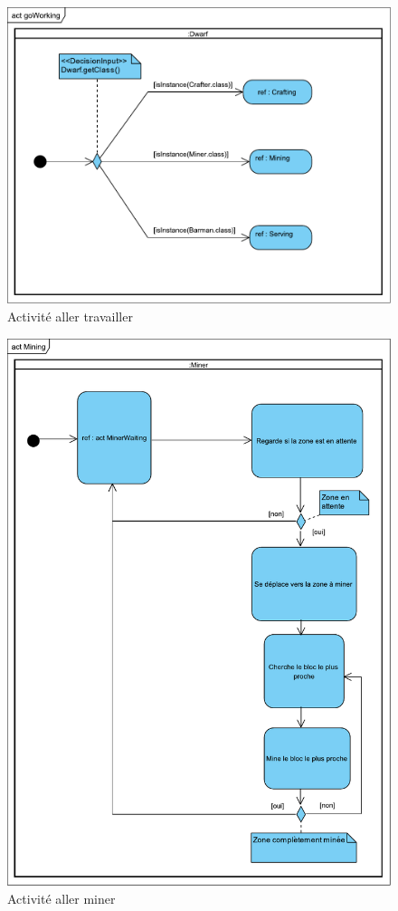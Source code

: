 \documentclass[a4paper]{report}
\begin{document}
\begin{figure}[H]
		\center
    \includegraphics[width=15cm]{img/act/goWorking}
    \caption{Activité aller travailler}
		\label{}
\end{figure}

\begin{figure}[H]
    \center
    \includegraphics[width=15cm]{img/act/Mining}
    \caption{Activité aller miner}
		\label{}
\end{figure}
\end{document}
